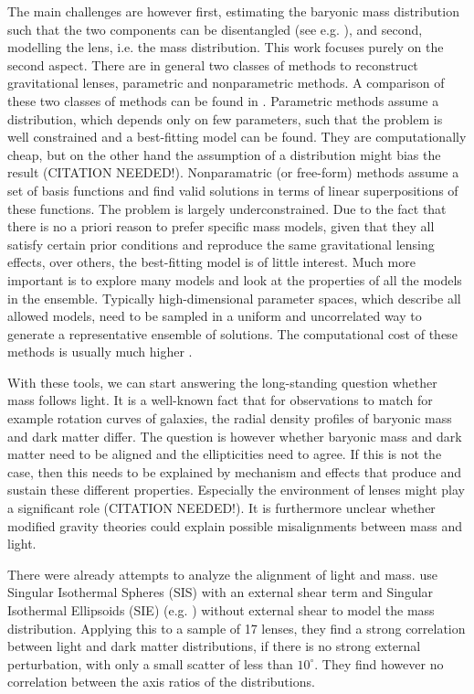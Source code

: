 \documentclass[useAMS,usenatbib]{mn2e}
\begin{document}
The main challenges are however first, estimating the baryonic mass distribution such that the two components can be disentangled (see e.g. \cite{leier11phd}), and second, modelling the lens, i.e. the mass distribution. This work focuses purely on the second aspect. There are in general two classes of methods to reconstruct gravitational lenses, parametric and nonparametric methods. A comparison of these two classes of methods can be found in \cite{2008ApJ...681..814C}. Parametric methods assume a distribution, which depends only on few parameters, such that the problem is well constrained and a best-fitting model can be found. They are computationally cheap, but on the other hand the assumption of a distribution might bias the result (CITATION NEEDED!). Nonparamatric (or free-form) methods assume a set of basis functions and find valid solutions in terms of linear superpositions of these functions. The problem is largely underconstrained. Due to the fact that there is no a priori reason to prefer specific mass models, given that they all satisfy certain prior conditions and reproduce the same gravitational lensing effects, over others, the best-fitting model is of little interest. Much more important is to explore many models and look at the properties of all the models in the ensemble. Typically high-dimensional parameter spaces, which describe all allowed models, need to be sampled in a uniform and uncorrelated way to generate a representative ensemble of solutions. The computational cost of these methods is usually much higher \citep{2008ApJ...679...17C,2012MNRAS.425.3077L}.

With these tools, we can start answering the long-standing question whether mass follows light. It is a well-known fact that for observations to match for example rotation curves of galaxies, the radial density profiles of baryonic mass and dark matter differ. The question is however whether baryonic mass and dark matter need to be aligned and the ellipticities need to agree. If this is not the case, then this needs to be explained by mechanism and effects that produce and sustain these different properties. Especially the environment of lenses might play a significant role (CITATION NEEDED!). It is furthermore unclear whether modified gravity theories could explain possible misalignments between mass and light.

There were already attempts to analyze the alignment of light and mass. \cite{1997ApJ...482..604K} use Singular Isothermal Spheres (SIS) with an external shear term and Singular Isothermal Ellipsoids (SIE) (e.g. \cite{1994A&A...284..285K}) without external shear to model the mass distribution. Applying this to a sample of 17 lenses, they find a strong correlation between light and dark matter distributions, if there is no strong external perturbation, with only a small scatter of less than $10^{\circ}$. They find however no correlation between the axis ratios of the distributions.
\end{document}
